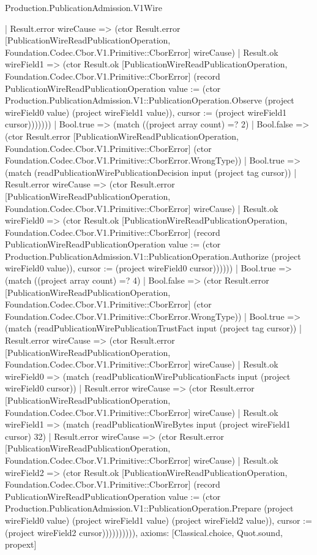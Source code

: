 \begin{lexlean}{Production.PublicationAdmission.V1Wire}
\begin{semanticmodule}
{                  | Result.error wireCause => (ctor Result.error [PublicationWireReadPublicationOperation, Foundation.Codec.Cbor.V1.Primitive::CborError] wireCause)
                  | Result.ok wireField1 => (ctor Result.ok [PublicationWireReadPublicationOperation, Foundation.Codec.Cbor.V1.Primitive::CborError] (record PublicationWireReadPublicationOperation {value := (ctor Production.PublicationAdmission.V1::PublicationOperation.Observe (project wireField0 value) (project wireField1 value)), cursor := (project wireField1 cursor)}))))))
          | Bool.true => (match ((project array count) =? 2)
            | Bool.false => (ctor Result.error [PublicationWireReadPublicationOperation, Foundation.Codec.Cbor.V1.Primitive::CborError] (ctor Foundation.Codec.Cbor.V1.Primitive::CborError.WrongType))
            | Bool.true => (match (readPublicationWirePublicationDecision input (project tag cursor))
              | Result.error wireCause => (ctor Result.error [PublicationWireReadPublicationOperation, Foundation.Codec.Cbor.V1.Primitive::CborError] wireCause)
              | Result.ok wireField0 => (ctor Result.ok [PublicationWireReadPublicationOperation, Foundation.Codec.Cbor.V1.Primitive::CborError] (record PublicationWireReadPublicationOperation {value := (ctor Production.PublicationAdmission.V1::PublicationOperation.Authorize (project wireField0 value)), cursor := (project wireField0 cursor)})))))
        | Bool.true => (match ((project array count) =? 4)
          | Bool.false => (ctor Result.error [PublicationWireReadPublicationOperation, Foundation.Codec.Cbor.V1.Primitive::CborError] (ctor Foundation.Codec.Cbor.V1.Primitive::CborError.WrongType))
          | Bool.true => (match (readPublicationWirePublicationTrustFact input (project tag cursor))
            | Result.error wireCause => (ctor Result.error [PublicationWireReadPublicationOperation, Foundation.Codec.Cbor.V1.Primitive::CborError] wireCause)
            | Result.ok wireField0 => (match (readPublicationWirePublicationFacts input (project wireField0 cursor))
              | Result.error wireCause => (ctor Result.error [PublicationWireReadPublicationOperation, Foundation.Codec.Cbor.V1.Primitive::CborError] wireCause)
              | Result.ok wireField1 => (match (readPublicationWireBytes input (project wireField1 cursor) 32)
                | Result.error wireCause => (ctor Result.error [PublicationWireReadPublicationOperation, Foundation.Codec.Cbor.V1.Primitive::CborError] wireCause)
                | Result.ok wireField2 => (ctor Result.ok [PublicationWireReadPublicationOperation, Foundation.Codec.Cbor.V1.Primitive::CborError] (record PublicationWireReadPublicationOperation {value := (ctor Production.PublicationAdmission.V1::PublicationOperation.Prepare (project wireField0 value) (project wireField1 value) (project wireField2 value)), cursor := (project wireField2 cursor)}))))))))),
  axioms: [Classical.choice, Quot.sound, propext]
}


\end{semanticmodule}
\end{lexlean}

